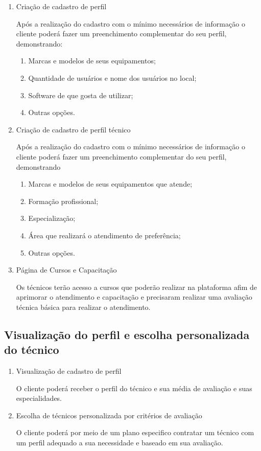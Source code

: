 \documentclass[
    12pt,               %
    openright,          %
    oneside,
    a4paper,            %
    MODELO,             %
    english,            %
    brazil              %
   ]{ifsp-spo-inf-ctds}
\begin{document}
\begin{enumerate}
	\item Criação de cadastro de perfil
	
	Após a realização do cadastro com o mínimo necessários de informação o cliente poderá fazer um preenchimento complementar do seu perfil, demonstrando:
	
		\begin{enumerate}
		\item Marcas e modelos de seus equipamentos;
		\item Quantidade de usuários e nome dos usuários no local;
		\item Software de que gosta de utilizar;
		\item Outras opções.
		\end{enumerate}
	
	\item Criação de cadastro de perfil técnico
	
	Após a realização do cadastro com o mínimo necessários de informação o cliente poderá fazer um preenchimento complementar do seu perfil, demonstrando
	
		\begin{enumerate}
			
			\item Marcas e modelos de seus equipamentos que atende;
			\item Formação profissional;
			\item Especialização;
			\item Área que realizará o atendimento de preferência;
			\item Outras opções. 
			
		\end{enumerate}
	
	\item Página de Cursos e Capacitação
	
		Os técnicos terão acesso a cursos que poderão realizar na plataforma afim de aprimorar o atendimento e capacitação e precisaram realizar uma avaliação técnica básica para realizar o atendimento.
	
\end{enumerate}

\subsection{Visualização do perfil e escolha personalizada do técnico}

\begin{enumerate}
	
	\item Visualização de cadastro de perfil
	
	O cliente poderá receber o perfil do técnico e sua média de avaliação e suas especialidades.
	
	\item Escolha de técnicos personalizada por critérios de avaliação
	
	O cliente poderá por meio de um plano especifico contratar um técnico com um perfil adequado a sua necessidade e baseado em sua avaliação.
	
\end{enumerate}
\end{document}
